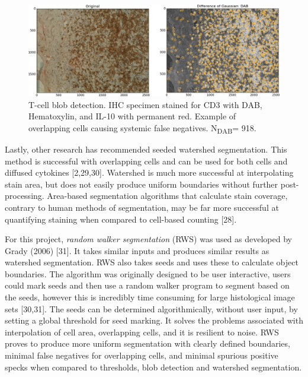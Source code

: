 \documentclass[12pt]{article}
\begin{document}
\begin{figure}[H]
  \includegraphics[width=\linewidth]{4BlobDetectHard.png}
  \caption{T-cell blob detection. IHC specimen stained for CD3 with DAB, Hematoxylin, and IL-10 with permanent red.  Example of overlapping cells causing systemic false negatives. N\textsubscript{DAB}= 918.}
  \label{fig:BlobDetectHard4}
\end{figure}


Lastly, other research has recommended seeded watershed segmentation. This method is successful with overlapping cells and can be used for both cells and diffused cytokines [2,29,30]. Watershed is much more successful at interpolating stain area, but does not easily produce uniform boundaries without further post-processing. Area-based segmentation algorithms that calculate stain coverage, contrary to human methods of segmentation, may be far more successful at quantifying staining when compared to cell-based counting [28].
	
For this project, \textit{random walker segmentation} (RWS) was used as developed by Grady (2006) [31]. It takes similar inputs and produces similar results as watershed segmentation. RWS also takes seeds and uses these to calculate object boundaries. The algorithm was originally designed to be user interactive, users could mark seeds and then use a random walker program to segment based on the seeds, however this is incredibly time consuming for large histological image sets [30,31]. The seeds can be determined algorithmically, without user input, by setting a global threshold for seed marking. It solves the problems associated with interpolation of cell area, overlapping cells, and it is resilient to noise. RWS proves to produce more uniform segmentation with clearly defined boundaries, minimal false negatives for overlapping cells, and minimal spurious positive specks when compared to thresholds, blob detection and watershed segmentation.
\end{document}
